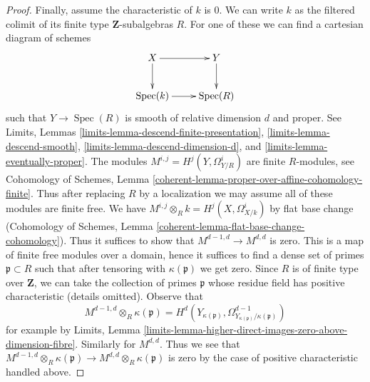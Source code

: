 \documentclass[10pt,a4paper]{amsart}
\theoremstyle{plain}
\theoremstyle{definition}
\theoremstyle{remark}
\numberwithin{equation}{subsection}
\def\Spec{\mathop{\mathrm{Spec}}}
\begin{document}
\begin{proof}
\medskip\noindent
Finally, assume the characteristic of $k$ is $0$.
We can write $k$ as the filtered colimit of its finite type
$\mathbf{Z}$-subalgebras $R$. For one of these we can find a
cartesian diagram of schemes
$$
\xymatrix{
X \ar[d] \ar[r] & Y \ar[d] \\
\Spec(k) \ar[r] & \Spec(R)
}
$$
such that $Y \to \Spec(R)$ is smooth of relative dimension $d$ and proper.
See Limits, Lemmas \ref{limits-lemma-descend-finite-presentation},
\ref{limits-lemma-descend-smooth}, \ref{limits-lemma-descend-dimension-d}, and
\ref{limits-lemma-eventually-proper}.
The modules $M^{i, j} = H^j(Y, \Omega^i_{Y/R})$ are finite $R$-modules, see
Cohomology of Schemes, Lemma
\ref{coherent-lemma-proper-over-affine-cohomology-finite}.
Thus after replacing $R$ by a localization we may assume all of these
modules are finite free. We have
$M^{i, j} \otimes_R k = H^j(X, \Omega^i_{X/k})$
by flat base change (Cohomology of Schemes, Lemma
\ref{coherent-lemma-flat-base-change-cohomology}).
Thus it suffices to show that $M^{d - 1, d} \to M^{d, d}$
is zero. This is a map of finite free modules over a domain,
hence it suffices to find a dense set of primes $\mathfrak p \subset R$
such that after tensoring with $\kappa(\mathfrak p)$ we get zero.
Since $R$ is of finite type over $\mathbf{Z}$, we can take
the collection of primes $\mathfrak p$ whose residue field
has positive characteristic (details omitted). Observe that
$$
M^{d - 1, d} \otimes_R \kappa(\mathfrak p) =
H^d(Y_{\kappa(\mathfrak p)},
\Omega^{d - 1}_{Y_{\kappa(\mathfrak p)}/\kappa(\mathfrak p)})
$$
for example by Limits, Lemma
\ref{limits-lemma-higher-direct-images-zero-above-dimension-fibre}.
Similarly for $M^{d, d}$. Thus we see that
$M^{d - 1, d} \otimes_R \kappa(\mathfrak p) \to
M^{d, d} \otimes_R \kappa(\mathfrak p)$
is zero by the case of positive characteristic handled above.
\end{proof}
\end{document}
